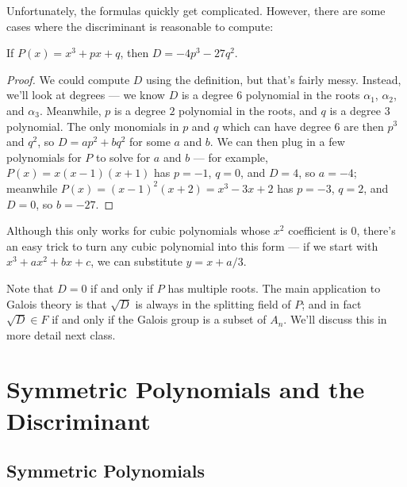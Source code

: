 Unfortunately, the formulas quickly get complicated. However, there are some cases where the discriminant is reasonable to compute:

\begin{example}
    If $P(x) = x^3 + px + q$, then $D = -4p^3 - 27q^2$.
\end{example}

\begin{proof}
We could compute $D$ using the definition, but that's fairly messy. Instead, we'll look at degrees --- we know $D$ is a degree $6$ polynomial in the roots $\alpha_1$, $\alpha_2$, and $\alpha_3$. Meanwhile, $p$ is a degree $2$ polynomial in the roots, and $q$ is a degree $3$ polynomial. The only monomials in $p$ and $q$ which can have degree $6$ are then $p^3$ and $q^2$, so $D = ap^2 + bq^2$ for some $a$ and $b$. We can then plug in a few polynomials for $P$ to solve for $a$ and $b$ --- for example, $P(x) = x(x - 1)(x + 1)$ has $p = -1$, $q = 0$, and $D = 4$, so $a = -4$; meanwhile $P(x) = (x - 1)^2(x + 2) = x^3 - 3x + 2$ has $p = -3$, $q = 2$, and $D = 0$, so $b = -27$. 
\end{proof}

Although this only works for cubic polynomials whose $x^2$ coefficient is $0$, there's an easy trick to turn any cubic polynomial into this form --- if we start with $x^3 + ax^2 + bx + c$, we can substitute $y = x + a/3$. 

Note that $D = 0$ if and only if $P$ has multiple roots. The main application to Galois theory is that $\sqrt{D}$ is always in the splitting field of $P$; and in fact $\sqrt{D} \in F$ if and only if the Galois group is a subset of $A_n.$ We'll discuss this in more detail next class.



\section{Symmetric Polynomials and the Discriminant}

\subsection{Symmetric Polynomials}

